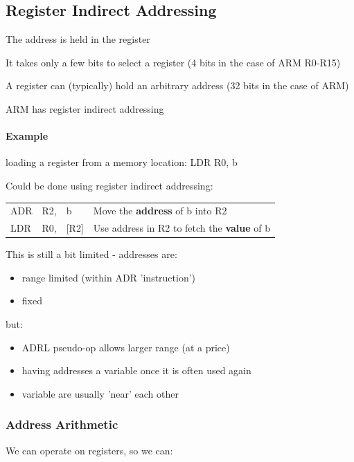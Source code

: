 \subsection{Register Indirect Addressing}
The address is held in the register

It takes only a few bits to select a register (4 bits in the case of ARM R0-R15)

A register can (typically) hold an arbitrary address (32 bits in the case of
ARM)

ARM has register indirect addressing

\paragraph{Example}
loading a register from a memory location: LDR R0, b

Could be done using register indirect addressing:

\begin{center}
    \begin{tabularx}{0.8\textwidth}{l l l X}
        ADR & R2, & b & Move the {\bf address} of b into R2\\
        LDR & R0, & [R2] & Use address in R2 to fetch the {\bf value} of b\\
    \end{tabularx}
\end{center}

This is still a bit limited - addresses are:

\begin{itemize}
  \item range limited (within ADR 'instruction')
  \item fixed
\end{itemize}

but:

\begin{itemize}
  \item ADRL pseudo-op allows larger range (at a price)
  \item having addresses a variable once it is often used again
  \item variable are usually 'near' each other
\end{itemize}

\subsubsection{Address Arithmetic}
We can operate on registers, so we can:

